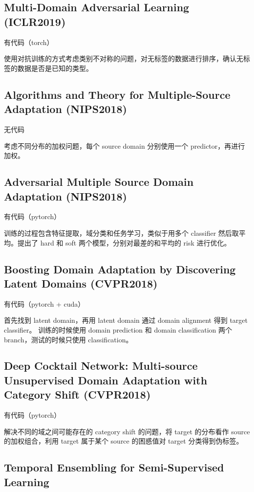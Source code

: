 \documentclass[UTF8]{ctexart}
\begin{document}
\subsection{Multi-Domain Adversarial Learning (ICLR2019)}

有代码（torch）

使用对抗训练的方式考虑类别不对称的问题，对无标签的数据进行排序，确认无标签的数据是否是已知的类型。

\subsection{Algorithms and Theory for Multiple-Source Adaptation (NIPS2018)}

无代码

考虑不同分布的加权问题，每个 source domain 分别使用一个 predictor，再进行加权。

\subsection{Adversarial Multiple Source Domain Adaptation (NIPS2018)}

有代码（pytorch）

训练的过程包含特征提取，域分类和任务学习，类似于用多个 classifier 然后取平均。提出了 hard 和 soft 两个模型，分别对最差的和平均的 risk 进行优化。

\subsection{Boosting Domain Adaptation by Discovering Latent Domains (CVPR2018)}

有代码（pytorch + cuda）

首先找到 latent domain，再用 latent domain 通过 domain alignment 得到 target classifier。
训练的时候使用 domain prediction 和 domain classification 两个 branch，测试的时候只使用 classification。

\subsection{Deep Cocktail Network: Multi-source Unsupervised Domain Adaptation with Category Shift (CVPR2018)}

有代码（pytorch）

解决不同的域之间可能存在的 category shift 的问题，将 target 的分布看作 source 的加权组合，利用 target 属于某个 source 的困惑值对 target 分类得到伪标签。

\subsection{Temporal Ensembling for Semi-Supervised Learning}
\end{document}
